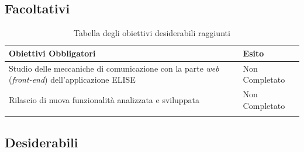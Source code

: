 \subsection{Facoltativi}

	\begin{center}
		  \bgroup
		  \def\arraystretch{1.4}
		   \begin{longtable}{ | p{9cm} | p{2cm} | }  \hline
			 
			 \cellcolor[gray]{0.9} \textbf{Obiettivi Obbligatori} & \cellcolor[gray]{0.9} \textbf{Esito} \\ \hline
						 
			Studio delle meccaniche di comunicazione con la parte \textit{web} (\textit{front-end}) dell'applicazione ELISE & Non Completato  \\ \hline
			Rilascio di nuova funzionalità analizzata e sviluppata  & Non Completato  \\ \hline

			
			\caption{Tabella degli obiettivi desiderabili raggiunti}
			
		    \end{longtable}
		  \egroup
		\end{center}

\subsection{Desiderabili}

